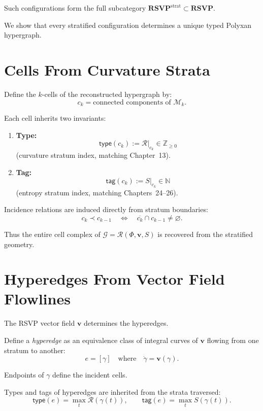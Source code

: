 Such configurations form the full subcategory
$\mathbf{RSVP}^{\mathrm{strat}} \subset \mathbf{RSVP}$.

We show that every stratified configuration determines a unique
typed Polyxan hypergraph.

\section{Cells From Curvature Strata}

Define the $k$-cells of the reconstructed hypergraph by:
\[
c_k = \text{connected components of } \mathcal{M}_k.
\]

Each cell inherits two invariants:

\begin{enumerate}
\item \textbf{Type:}
      \[
      \mathsf{type}(c_k)
      := \mathcal{R}|_{c_k} \in \mathbb{Z}_{\ge 0}
      \]
      (curvature stratum index, matching Chapter~13).

\item \textbf{Tag:}
      \[
      \mathsf{tag}(c_k)
      := S|_{c_k} \in \mathbb{N}
      \]
      (entropy stratum index, matching Chapters~24–26).
\end{enumerate}

Incidence relations are induced directly from stratum boundaries:
\[
c_k \prec c_{k-1}
\quad\Longleftrightarrow\quad
\overline{c_k} \cap c_{k-1} \neq \varnothing.
\]

Thus the entire cell complex of $\mathcal{G} = \mathcal{R}(\Phi,\mathbf{v},S)$
is recovered from the stratified geometry.

\section{Hyperedges From Vector Field Flowlines}

The RSVP vector field $\mathbf{v}$ determines the hyperedges.

Define a \emph{hyperedge} as an equivalence class of integral curves of $\mathbf{v}$
flowing from one stratum to another:
\[
e = [\gamma] \quad\text{where}\quad \dot{\gamma} = \mathbf{v}(\gamma).
\]

Endpoints of $\gamma$ define the incident cells.

Types and tags of hyperedges are inherited from the strata traversed:
\[
\mathsf{type}(e) = \max_{t}\mathcal{R}(\gamma(t)),
\qquad
\mathsf{tag}(e) = \max_{t}S(\gamma(t)).
\]

